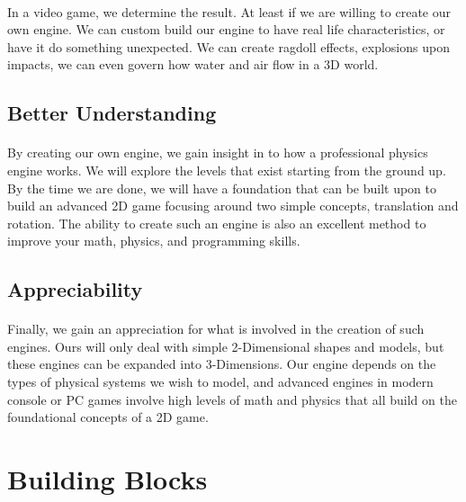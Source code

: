 \documentclass[12pt, letterpaper]{report}
\begin{document}
		\paragraph{}In a video game, we determine the result. At least if we are willing to create our own engine. We can custom build our engine to have real life characteristics, or have it do something unexpected. We can create ragdoll effects, explosions upon impacts, we can even govern how water and air flow in a 3D world. 
		\subsection{Better Understanding}
		\paragraph{}By creating our own engine, we gain insight in to how a professional physics engine works. We will explore the levels that exist starting from the ground up. By the time we are done, we will have a foundation that can be built upon to build an advanced 2D game focusing around two simple concepts, translation and rotation. The ability to create such an engine is also an excellent method to improve your math, physics, and programming skills.
		\subsection{Appreciability}
		\paragraph{}Finally, we gain an appreciation for what is involved in the creation of such engines. Ours will only deal with simple 2-Dimensional shapes and models, but these engines can be expanded into 3-Dimensions. Our engine depends on the types of physical systems we wish to model, and advanced engines in modern console or PC games involve high levels of math and physics that all build on the foundational concepts of a 2D game. 
	\section{Building Blocks}
\end{document}
